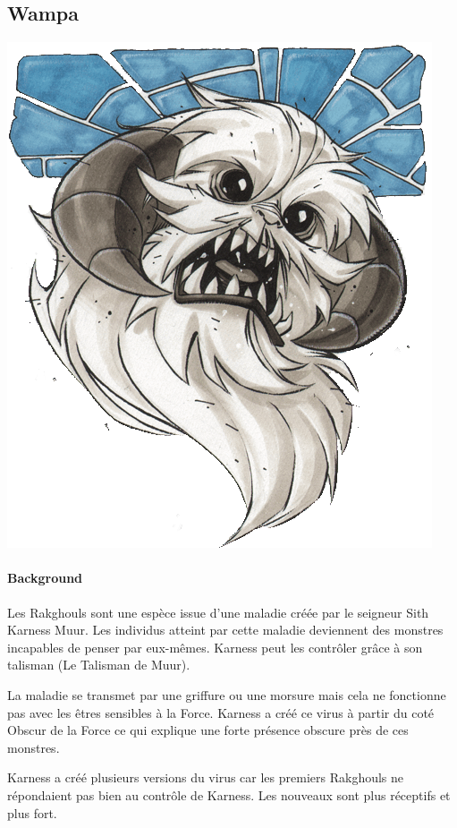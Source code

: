 \subsection{Wampa} \label{sec:wampa}
\noindent\includegraphics[width=\linewidth]{_img/dos-au-muur/wampa.png}

\paragraph{Background}
Les Rakghouls sont une espèce issue d’une maladie créée par le seigneur Sith Karness Muur. Les individus atteint par cette maladie deviennent des monstres incapables de penser par eux-mêmes. Karness peut les contrôler grâce à son talisman (Le Talisman de Muur).

La maladie se transmet par une griffure ou une morsure mais cela ne fonctionne pas avec les êtres sensibles à la Force. Karness a créé ce virus à partir du coté Obscur de la Force ce qui explique une forte présence obscure près de ces monstres.

Karness a créé plusieurs versions du virus car les premiers Rakghouls ne répondaient pas bien au contrôle de Karness. Les nouveaux sont plus réceptifs et plus fort.

